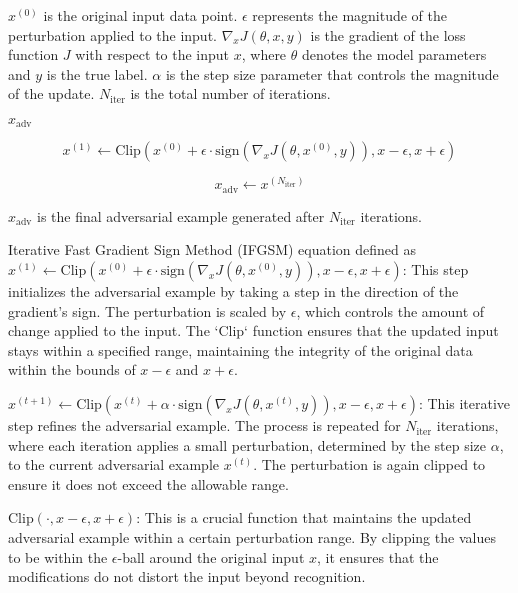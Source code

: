 \( x^{(0)} \) is the original input data point.
\( \epsilon \) represents the magnitude of the perturbation applied to the input.
\( \nabla_x J(\theta, x, y) \) is the gradient of the loss function \( J \) with respect to the input \( x \), where \( \theta \) denotes the model parameters and \( y \) is the true label.
\( \alpha \) is the step size parameter that controls the magnitude of the update.
\( N_{\text{iter}} \) is the total number of iterations.

\begin{algorithm}
    \( x_{\text{adv}} \)

    \[
    x^{(1)} \leftarrow \text{Clip}\left(x^{(0)} + \epsilon \cdot \text{sign}(\nabla_x J(\theta, x^{(0)}, y)), x - \epsilon, x + \epsilon\right)
    \]


    \[
    x_{\text{adv}} \leftarrow x^{(N_{\text{iter}})}
    \]
\end{algorithm}


\( x_{\text{adv}} \) is the final adversarial example generated after \( N_{\text{iter}} \) iterations.

Iterative Fast Gradient Sign Method (IFGSM) equation defined as
\( x^{(1)} \leftarrow \text{Clip}\left(x^{(0)} + \epsilon \cdot \text{sign}(\nabla_x J(\theta, x^{(0)}, y)), x - \epsilon, x + \epsilon\right) \): 
This step initializes the adversarial example by taking a step in the direction of the gradient's sign.
The perturbation is scaled by \( \epsilon \), which controls the amount of change applied to the input.
The `Clip` function ensures that the updated input stays within a specified range, maintaining the integrity of the original data within the bounds of \( x - \epsilon \) and \( x + \epsilon \).

\( x^{(t+1)} \leftarrow \text{Clip}\left(x^{(t)} + \alpha \cdot \text{sign}(\nabla_x J(\theta, x^{(t)}, y)), x - \epsilon, x + \epsilon\right) \): 
This iterative step refines the adversarial example.
The process is repeated for \( N_{\text{iter}} \) iterations, where each iteration applies a small perturbation, determined by the step size \( \alpha \), to the current adversarial example \( x^{(t)} \).
The perturbation is again clipped to ensure it does not exceed the allowable range.

\( \text{Clip}(\cdot, x - \epsilon, x + \epsilon) \): 
This is a crucial function that maintains the updated adversarial example within a certain perturbation range.
By clipping the values to be within the \( \epsilon \)-ball around the original input \( x \), it ensures that the modifications do not distort the input beyond recognition.
